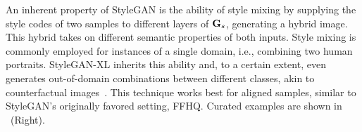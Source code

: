 An inherent property of StyleGAN is the ability of style mixing by supplying the style codes of two samples to different layers of $\mathbf{G}_s$, generating a hybrid image. This hybrid takes on different semantic properties of both inputs. Style mixing is commonly employed for instances of a single domain, i.e., combining two human portraits. StyleGAN-XL inherits this ability and, to a certain extent, even generates out-of-domain combinations between different classes, akin to counterfactual images~\cite{Sauer2021ICLR}. This technique works best for aligned samples, similar to StyleGAN's originally favored setting, FFHQ. Curated examples are shown in ~(Right).
\editing
\editingsupp

